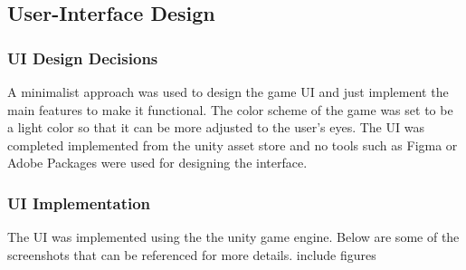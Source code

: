 \subsection{User-Interface Design}
\subsubsection{UI Design Decisions}
A minimalist approach was used to design the game UI and just implement the main features to make it functional. The color scheme of the game was set to be a light color so that it can be more adjusted to the user's eyes. The UI was completed implemented from the unity asset store and no tools such as Figma or Adobe Packages were used for designing the interface.
\subsubsection{UI Implementation}
The UI was implemented using the the unity game engine. Below are some of the screenshots that can be referenced for more details.
include figures


